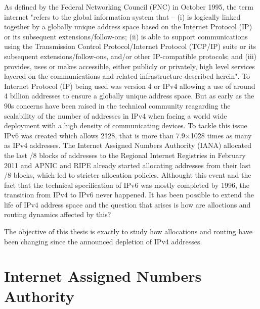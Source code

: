 \documentclass[11pt,a4paper]{scrreprt}
\begin{document}
As defined by the Federal Networking Council (FNC) in October 1995, the term internet "refers to the global information system that -- (i) is logically linked together by a globally unique address space based on the Internet Protocol (IP) or its subsequent extensions/follow-ons; (ii) is able to support communications using the Transmission Control Protocol/Internet Protocol (TCP/IP) suite or its subsequent extensions/follow-ons, and/or other IP-compatible protocols; and (iii) provides, uses or makes accessible, either publicly or privately, high level services layered on the communications and related infrastructure described herein". To Internet Protocol (IP) being used was version 4 or IPv4 allowing a use of around 4 billion addresses to ensure a globally unique address space. 
But as early as the 90s concerns have been raised in the technical community reagarding the scalability of the number of addresses in IPv4 when facing a world wide deployment with a high density of communicating devices. To tackle this issue IPv6 was created which allows 2\^128, that is more than 7.9×10\^28 times as many as IPv4 addresses. 
The Internet Assigned Numbers Authority (IANA) allocated the last /8 blocks of addresses to the Regional Internet Registries in February 2011 and APNIC and RIPE already started allocating addresses from their last /8 blocks, which led to stricter allocation policies. Althought this event and the fact that the technical specification of IPv6 was mostly completed by 1996, the transition from IPv4 to IPv6 never happened. It has been possible to extend the life of IPv4 address space and the question that arises is how are alloctions and routing dynamics affected by this?     

The objective of this thesis is exactly to study how allocations and routing have been changing since the announced depletion of IPv4 addresses. 

\section{Internet Assigned Numbers Authority}
\end{document}
